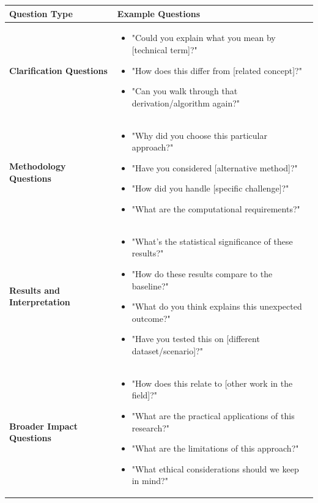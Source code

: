 \documentclass[11pt,a4paper]{article}
\begin{document}
\begin{table}[h!]
\centering
\begin{tabular}{|p{3.5cm}|p{11cm}|}
\hline
\textbf{Question Type} & \textbf{Example Questions} \\
\hline
\hline
\textbf{Clarification Questions} & 
\begin{itemize}[leftmargin=*,noitemsep,topsep=0pt]
    \item "Could you explain what you mean by [technical term]?"
    \item "How does this differ from [related concept]?"
    \item "Can you walk through that derivation/algorithm again?"
\end{itemize} \\
\hline
\textbf{Methodology Questions} & 
\begin{itemize}[leftmargin=*,noitemsep,topsep=0pt]
    \item "Why did you choose this particular approach?"
    \item "Have you considered [alternative method]?"
    \item "How did you handle [specific challenge]?"
    \item "What are the computational requirements?"
\end{itemize} \\
\hline
\textbf{Results and Interpretation} & 
\begin{itemize}[leftmargin=*,noitemsep,topsep=0pt]
    \item "What's the statistical significance of these results?"
    \item "How do these results compare to the baseline?"
    \item "What do you think explains this unexpected outcome?"
    \item "Have you tested this on [different dataset/scenario]?"
\end{itemize} \\
\hline
\textbf{Broader Impact Questions} & 
\begin{itemize}[leftmargin=*,noitemsep,topsep=0pt]
    \item "How does this relate to [other work in the field]?"
    \item "What are the practical applications of this research?"
    \item "What are the limitations of this approach?"
    \item "What ethical considerations should we keep in mind?"
\end{itemize} \\

\end{tabular}
\end{table}
\end{document}
